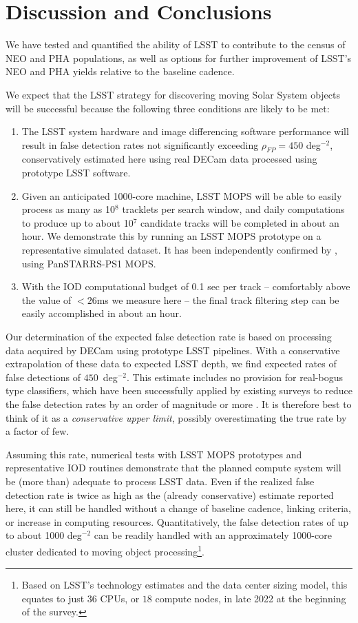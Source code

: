 

\section{Discussion and Conclusions\label{sec:discussion}}

We have tested and quantified the ability of LSST to contribute to the census of NEO and PHA populations, as well as options for further improvement of LSST's NEO and PHA yields relative to the baseline cadence.

We expect that the LSST strategy for discovering moving Solar System objects will be successful because the following three conditions are likely to be met:
\begin{enumerate}
	\item The LSST system hardware and image differencing software performance will result in false detection
	rates not significantly exceeding $\rho_{FP} =  450$ deg$^{-2}$, conservatively estimated here using real DECam data
	processed using prototype LSST software.
	\item Given an anticipated 1000-core machine, LSST MOPS will be able to easily process as many as
	10$^8$ tracklets per search window, and daily computations to produce up to about 10$^7$
	candidate tracks will be completed in about an hour. We demonstrate this by running an LSST MOPS prototype on a representative simulated dataset. It has been independently confirmed by \cite{VeresChesley2017mops}, using PanSTARRS-PS1 MOPS.
	\item With the IOD computational budget of 0.1 sec per track -- comfortably above the value of $<26$ms we measure here -- the final track filtering step can
	be easily accomplished in about an hour.
\end{enumerate}

Our determination of the expected false detection rate is based on processing data acquired by DECam using prototype LSST pipelines. With a conservative extrapolation of these data to expected LSST depth, we find expected rates of false detections of $450$~deg$^{-2}$. This estimate includes no provision for real-bogus type classifiers, which have been successfully applied by existing surveys to reduce the false detection rates by an order of magnitude or more \citep[e.g.][]{goldstein15}. It is therefore best to think of it as a {\it conservative upper limit}, possibly overestimating the true rate by a factor of few.

Assuming this rate, numerical tests with LSST MOPS prototypes and representative IOD routines demonstrate that the planned compute system will be (more than) adequate to
process LSST data. Even if the realized false detection rate is twice as high as
the (already conservative) estimate reported here, it can still be handled without a change of baseline cadence, linking criteria, or
increase in computing resources. Quantitatively, the false detection rates of up to about
1000 deg$^{-2}$ can be readily handled with an approximately 1000-core cluster dedicated to moving object processing\footnote{Based on LSST's technology estimates and the data center sizing model, this equates to just $36$ CPUs, or $18$ compute nodes, in late 2022 at the beginning of the survey.}.


